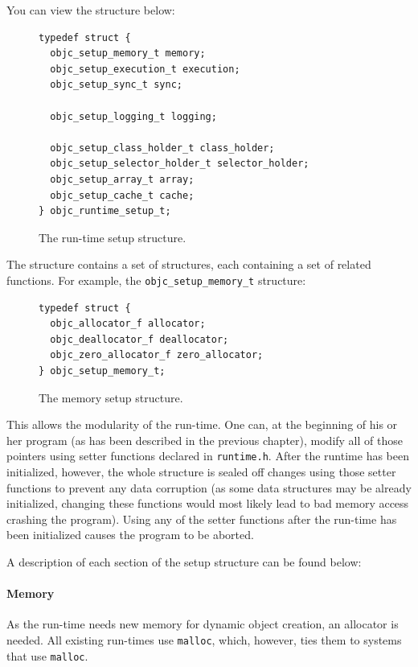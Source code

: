 You can view the structure below:

\begin{figure}[H]
\begin{verbatim}
typedef struct {
  objc_setup_memory_t memory;
  objc_setup_execution_t execution;
  objc_setup_sync_t sync;
  
  objc_setup_logging_t logging;
  
  objc_setup_class_holder_t class_holder;
  objc_setup_selector_holder_t selector_holder;
  objc_setup_array_t array;
  objc_setup_cache_t cache;
} objc_runtime_setup_t;
\end{verbatim}
\centering{}
\caption{The run-time setup structure.}
\label{fig:runtime_setup_structure}
\end{figure}

The structure contains a set of structures, each containing a set of related functions. For example, the \verb=objc_setup_memory_t= structure:

\begin{figure}[H]
\begin{verbatim}
typedef struct {
  objc_allocator_f allocator;
  objc_deallocator_f deallocator;
  objc_zero_allocator_f zero_allocator;
} objc_setup_memory_t;
\end{verbatim}
\centering{}
\caption{The memory setup structure.}
\label{memory_setup_structure}
\end{figure}

This allows the modularity of the run-time. One can, at the beginning of his or her program (as has been described in the previous chapter), modify all of those pointers using setter functions declared in \verb=runtime.h=. After the runtime has been initialized, however, the whole structure is sealed off changes using those setter functions to prevent any data corruption (as some data structures may be already initialized, changing these functions would most likely lead to bad memory access crashing the program). Using any of the setter functions after the run-time has been initialized causes the program to be aborted.

A description of each section of the setup structure can be found below:

\paragraph{Memory}

As the run-time needs new memory for dynamic object creation, an allocator is needed. All existing run-times use \verb=malloc=, which, however, ties them to systems that use \verb=malloc=.

